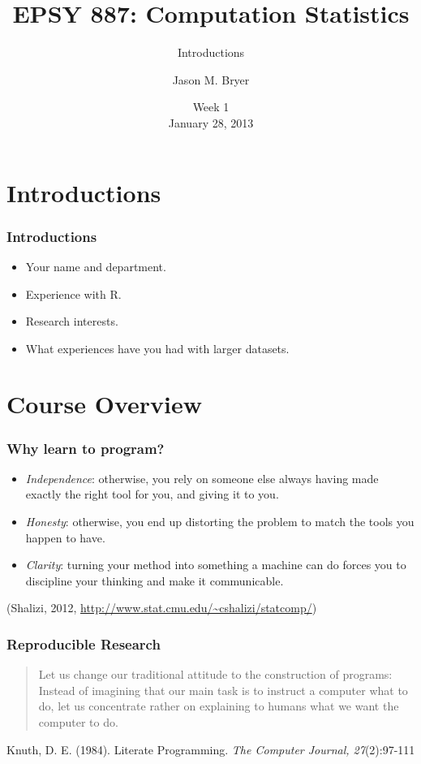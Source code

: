 \documentclass[10pt,slidestop,mathserif,c]{beamer}
\title{EPSY 887: Computation Statistics}
\subtitle{Introductions}
\author[Jason Bryer]{Jason M. Bryer}
\institute[Jason.Bryer.org]{\url{http://github.com/jbryer/CompStats}\\\href{mailto:jason@bryer.org}{jason@bryer.org}}
\date[Jan 28, 2013]{Week 1\\January 28, 2013}
\begin{document}


\frame{\titlepage}

\section{Introductions}

\begin{frame}[fragile]
	\frametitle{Introductions}
	\begin{itemize}
		\item Your name and department.
		\item Experience with R.
		\item Research interests.
		\item What experiences have you had with larger datasets.
	\end{itemize}

\end{frame}


\section{Course Overview}


\begin{frame}[fragile]
	\frametitle{Why learn to program?}
	\begin{itemize}
	\item<+-| alert@+> \textit{Independence}: otherwise, you rely on someone else always having made exactly the right tool for you, and giving it to you.
	\item<+-| alert@+> \textit{Honesty}: otherwise, you end up distorting the problem to match the tools you happen to have.
	\item<+-| alert@+> \textit{Clarity}: turning your method into something a machine can do forces you to discipline your thinking and make it communicable.
	\end{itemize}
	\vfill
	 \scriptsize (Shalizi, 2012, \url{http://www.stat.cmu.edu/~cshalizi/statcomp/})
\end{frame}

\begin{frame}[fragile]
	\frametitle{Reproducible Research}
	
	\begin{quote}Let us change our traditional attitude to the construction of programs: Instead of imagining that our main task is to instruct a computer what to do, let us concentrate rather on explaining to humans what we want the computer to do.\end{quote}
	\begin{flushright}\scriptsize Knuth, D. E. (1984). Literate Programming. \textit{The Computer Journal, 27}(2):97-111\end{flushright}
	
	
\end{frame}
\end{document}
